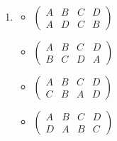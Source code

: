 \begin{enumerate}[{a.}]
\begin{multicols}{3}
\begin{itemize}
	\item
	$\begin{pmatrix}
	A & B & C & D\\
	D & B & A & C
	\end{pmatrix}$

	\item
	$\begin{pmatrix}
	A & B & C & D\\
	D & B & C & A
	\end{pmatrix}$
	
	\item
	$\begin{pmatrix}
	A & B & C & D\\
	D & C & A & B
	\end{pmatrix}$
	\end{itemize}
	\end{multicols}
	
\item
	\begin{multicols}{3}
	\begin{itemize}
	\item
	$\begin{pmatrix}
	A & B & C & D\\
	A & D & C & B
	\end{pmatrix}$
	
	\item
	$\begin{pmatrix}
	A & B & C & D\\
	B & C & D & A
	\end{pmatrix}$
	
	\item
	$\begin{pmatrix}
	A & B & C & D\\
	C & B & A & D
	\end{pmatrix}$
	
	\item
	$\begin{pmatrix}
	A & B & C & D\\
	D & A & B & C
	\end{pmatrix}$
	\end{itemize}
	\end{multicols}
\end{enumerate}


